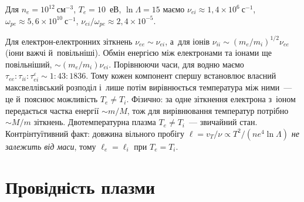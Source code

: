 \begin{Estimate}
Для $n_e=10^{12}~\mathrm{см}^{-3}$, $T_e=10$~еВ,
$\ln\Lambda=15$ маємо $\nu_{ei}\approx1{,}4\times10^6~\mathrm{с}^{-1}$,
$\omega_{pe}\approx5{,}6\times10^{10}~\mathrm{с}^{-1}$,
$\nu_{ei}/\omega_{pe}\approx2{,}4\times10^{-5}$.
\end{Estimate}

Для електрон-електронних зіткнень $\nu_{ee}\sim\nu_{ei}$, а~для іонів
$\nu_{ii}\sim(m_e/m_i)^{1/2}\nu_{ee}$ (іони важчі й~повільніші). Обмін енергією між
електронами та іонами ще повільніший, $\sim(m_e/m_i)\nu_{ei}$. Порівнюючи часи, для водню
маємо $\tau_{ee}:\tau_{ii}:\tau_{ei}^{\varepsilon}\sim1:43:1836$. Тому кожен компонент
спершу встановлює власний максвеллівський розподіл і~лише потім вирівнюється температура
між ними~--- це й~пояснює можливість $T_e\neq T_i$. Фізично: за одне зіткнення електрона з~іоном передається частка енергії $\sim m/M$,
тож для вирівнювання температур потрібно $\sim M/m$ зіткнень. Двотемпературна плазма $T_e\neq T_i$~--- звичайний стан.
Контрінтуїтивний факт: довжина вільного пробігу $\ell=v_T/\nu\propto T^2/(ne^4\ln\Lambda)$ \emph{не залежить від маси}, тому $\ell_e=\ell_i$ при $T_e=T_i$.



\section{Провідність плазми}



